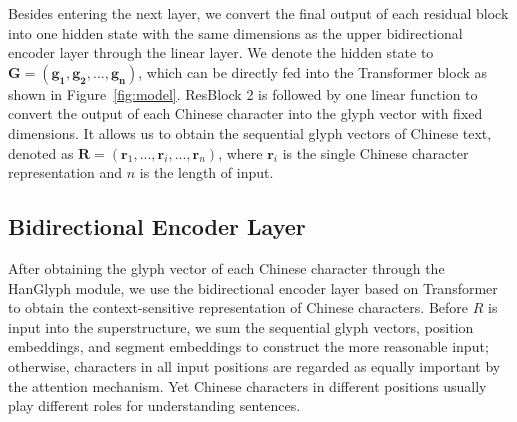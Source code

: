 Besides entering the next layer, we convert the final output of each residual block into one hidden state with the same dimensions as the upper bidirectional encoder layer through the linear layer. We denote the hidden state to $\mathbf{G}=(\mathbf{g_1}, \mathbf{g_2}, ..., \mathbf{g_n})$, which can be directly fed into the Transformer block as shown in Figure~\ref{fig:model}. ResBlock 2 is followed by one linear function to convert the output of each Chinese character into the glyph vector with fixed dimensions. It allows us to obtain the sequential glyph vectors of Chinese text, denoted as $\mathbf{R}=(\mathbf{r}_1, ..., \mathbf{r}_i, ..., \mathbf{r}_n)$, where $\mathbf{r}_i$ is the single Chinese character representation and $n$ is the length of input.

\subsection{Bidirectional Encoder Layer}

After obtaining the glyph vector of each Chinese character through the HanGlyph module, we use the bidirectional encoder layer based on Transformer\cite{attention} to obtain the context-sensitive representation of Chinese characters. 
Before $R$ is input into the superstructure, we sum the sequential glyph vectors, position embeddings, and segment embeddings to construct the more reasonable input; otherwise, characters in all input positions are regarded as equally important by the attention mechanism. Yet Chinese characters in different positions usually play different roles for understanding sentences.       

